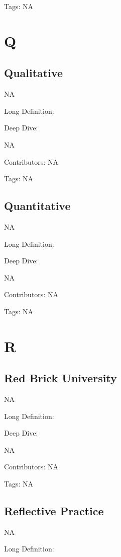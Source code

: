 \documentclass[
  letterpaper,
  DIV=11,
  numbers=noendperiod]{scrreprt}
\begin{document}
Tags: NA


\chapter{Q}\label{q}

\section{Qualitative}\label{qualitative}

NA

Long Definition:

Deep Dive:

NA

Contributors: NA

Tags: NA

\section{Quantitative}\label{quantitative}

NA

Long Definition:

Deep Dive:

NA

Contributors: NA

Tags: NA


\chapter{R}\label{r}

\section{Red Brick University}\label{red-brick-university}

NA

Long Definition:

Deep Dive:

NA

Contributors: NA

Tags: NA

\section{Reflective Practice}\label{reflective-practice}

NA

Long Definition:
\end{document}
